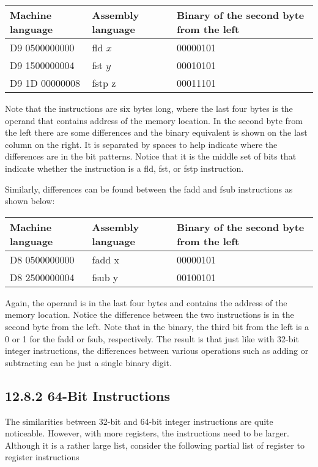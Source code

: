 \documentclass[10pt]{article}
\begin{document}
\begin{center}
\begin{tabular}{|l|l|l|}
\hline
Machine language & Assembly language & Binary of the second byte from the left \\
\hline
D9 0500000000 & fld $x$ & 00000101 \\
\hline
D9 1500000004 & fst $y$ & 00010101 \\
\hline
D9 1D 00000008 & fstp z & 00011101 \\
\hline
\end{tabular}
\end{center}

Note that the instructions are six bytes long, where the last four bytes is the operand that contains address of the memory location. In the second byte from the left there are some differences and the binary equivalent is shown on the last column on the right. It is separated by spaces to help indicate where the differences are in the bit patterns. Notice that it is the middle set of bits that indicate whether the instruction is a fld, fst, or fstp instruction.

Similarly, differences can be found between the fadd and fsub instructions as shown below:

\begin{center}
\begin{tabular}{|l|l|l|}
\hline
Machine language & Assembly language & Binary of the second byte from the left \\
\hline
D8 0500000000 & fadd x & 00000101 \\
\hline
D8 2500000004 & fsub y & 00100101 \\
\hline
\end{tabular}
\end{center}

Again, the operand is in the last four bytes and contains the address of the memory location. Notice the difference between the two instructions is in the second byte from the left. Note that in the binary, the third bit from the left is a 0 or 1 for the fadd or fsub, respectively. The result is that just like with 32-bit integer instructions, the differences between various operations such as adding or subtracting can be just a single binary digit.

\subsection*{12.8.2 64-Bit Instructions}
The similarities between 32-bit and 64-bit integer instructions are quite noticeable. However, with more registers, the instructions need to be larger. Although it is a rather large list, consider the following partial list of register to register instructions
\end{document}
